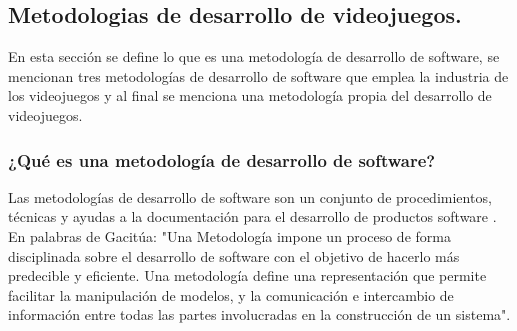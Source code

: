 \subsection{Metodologias de desarrollo de videojuegos.}\label{MetodoVideojuego}
	En esta sección se define lo que es una metodología de desarrollo de software, 
	se mencionan tres metodologías de desarrollo de software que emplea la industria 
	de los videojuegos y al final se menciona una metodología propia 
	del desarrollo de videojuegos. 
	
		 \subsubsection{¿Qué es una metodología de desarrollo de software?}
	Las metodologías de desarrollo de software son un conjunto de procedimientos, 
	técnicas y ayudas a la documentación para el desarrollo de productos software
	\cite{Ref_metodologia}.	En palabras de Gacitúa: "Una Metodología impone un proceso
	 de forma disciplinada sobre el desarrollo de software con el objetivo de hacerlo 
	 más predecible y eficiente. Una metodología define una representación que permite 
	 facilitar la manipulación de modelos, y la comunicación e intercambio de 
	 información entre todas las partes involucradas en la construcción de un 
	 sistema"\cite{Ref_Metod}. 

